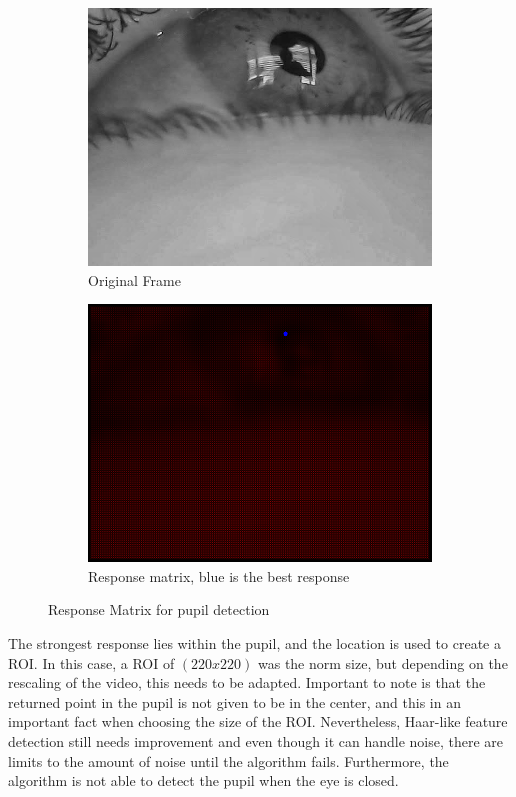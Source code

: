 \begin{figure}[h]
    \centering
    \begin{subfigure}{0.5\textwidth}
        \centering
        \includegraphics[width=0.9\linewidth]{plots/results/originalbest.png}
        \caption{Original Frame}
    \end{subfigure}%
    \hfill
    \begin{subfigure}{0.5\textwidth}
        \centering
        \includegraphics[width=0.9\linewidth]{plots/results/responsehaarbest.png}
        \caption{Response matrix, blue is the best response}
    \end{subfigure}%
 
    \caption{Response Matrix for pupil detection}
    \label{fig:limit_haar_good}
\end{figure}

The strongest response lies within the pupil, and the location is used to create a ROI. In this case, a ROI of $(220 x 220)$ was the norm size, but depending on the rescaling of the video, this needs to be adapted. Important to note is that the returned point in the pupil is not given to be in the center, and this in an important fact when choosing the size of the ROI.
Nevertheless, Haar-like feature detection still needs improvement and even though it can handle noise, there are limits to the amount of noise until the algorithm fails. Furthermore, the algorithm is not able to detect the pupil when the eye is closed.

